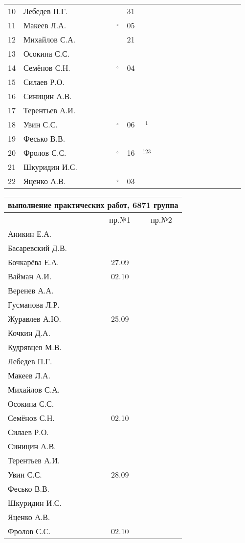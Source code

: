 \documentclass[a4paper,11pt]{article}
\newcommand*\OK{&\small \ding{51}$\!\!_\circ$} %
\newcommand*\ok{&{\small \ding{51}}} %
\newcommand*\no{&{\small }} %
\newcommand*\da{&{\small\ding{48}$\!\!_1$}} %
\newcommand*\dabc{&{\small\ding{48}$\!\!_{123}$}} %
\begin{document}
\begin{tabular}{l|l|cccccccccccccccccc}
10&Лебедев П.Г.    \ok\ok\no\ok\ok&31\no  \ok&&&&&&&&&&\\
11&Макеев Л.А.     \ok\ok\ok\ok\OK&05\ok  \ok&&&&&&&&&&\\
12&Михайлов С.А.   \no\no\ok\ok\ok&21\no  \ok&&&&&&&&&&\\
13&Осокина С.С.    \ok\ok\ok\ok\no\no\ok  \ok&&&&&&&&&&\\
14&Семёнов С.Н.    \ok\ok\ok\ok\OK&04\ok  \ok&&&&&&&&&&\\
15&Силаев Р.О.     \ok\ok\no\no\no\no\no  \no&&&&&&&&&&\\
16&Синицин А.В.    \ok\ok\no\ok\no\no\no  \no&&&&&&&&&&\\
17&Терентьев А.И.  \ok\ok\ok\ok\no\no\no  \no&&&&&&&&&&\\
18&Увин С.С.       \ok\ok\ok\ok\OK&06\da  \ok&&&&&&&&&&\\
19&Фесько В.В.     \no\no\no\no\no\no\no  \no&&&&&&&&&&\\
20&Фролов С.С.     \ok\ok\ok\ok\OK&16\dabc\ok&&&&&&&&&&\\ 
21&Шкуридин И.С.   \ok\ok\ok\ok\ok\no\ok  \ok&&&&&&&&&&\\
22&Яценко А.В.     \ok\ok\ok\ok\OK&03\ok  \ok&&&&&&&&&&\\ 
\bottomrule
\end{tabular} 
\newpage

\begin{tabular}{l|cc}
\multicolumn{3}{c}{выполнение практических работ, 6871 группа} \\
\toprule
& пр.№1 & пр.№2 \\
\midrule
Аникин Е.А.     &     &\\    
Басаревский Д.В.&     &\\
Бочкарёва Е.А.  &27.09&\\
Вайман А.И.     &02.10&\\
Веренев А.А.    &     &\\
Гусманова Л.Р.  &     &\\
Журавлев А.Ю.   &25.09&\\
Кочкин Д.А.     &     &\\
Кудрявцев М.В.  &     &\\
Лебедев П.Г.    &     &\\
Макеев Л.А.     &     &\\
Михайлов С.А.   &     &\\
Осокина С.С.    &     &\\
Семёнов С.Н.    &02.10&\\
Силаев Р.О.     &     &\\
Синицин А.В.    &     &\\
Терентьев А.И.  &     &\\
Увин С.С.       &28.09&\\
Фесько В.В.     &     &\\
Шкуридин И.С.   &     &\\
Яценко А.В.     &     &\\
Фролов С.С.     &02.10&\\
\bottomrule
\end{tabular}
\end{document}
